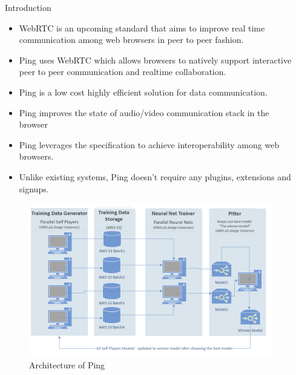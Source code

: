 \documentclass[final]{beamer}
\newlength{\sepwid}
\newlength{\onecolwid}
\begin{document}
\begin{frame}[t]
\begin{columns}[t]
\begin{column}{\onecolwid}
\begin{block}{Introduction}
\begin{itemize}
\item WebRTC is an upcoming standard that aims to improve real time communication among web browsers in peer to peer fashion.
\item Ping uses WebRTC which allows browsers to natively support interactive peer to peer communication and realtime collaboration.
\item Ping is a low cost highly efficient solution for data communication.
\item Ping improves the state of audio/video communication stack in the browser
\item Ping leverages the specification to achieve interoperability among web browsers.
\item Unlike existing systems, Ping doesn't require any plugins, extensions and signups. 
\end{itemize}



\end{block}


\begin{figure}
\includegraphics[width=1.0\linewidth]{distributed_arch.png}
\caption{Architecture of Ping}
\end{figure}


\end{column} %

\begin{column}{\sepwid}\end{column} %


\end{columns}
\end{frame}
\end{document}
